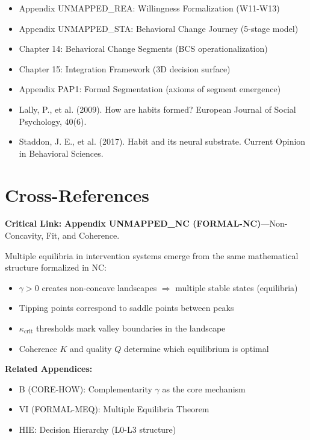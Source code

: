 \documentclass[11pt, a4paper]{article}
\begin{document}
\begin{itemize}
    \item Appendix UNMAPPED_REA: Willingness Formalization (W11-W13)
    \item Appendix UNMAPPED_STA: Behavioral Change Journey (5-stage model)
    \item Chapter 14: Behavioral Change Segments (BCS operationalization)
    \item Chapter 15: Integration Framework (3D decision surface)
    \item Appendix PAP1: Formal Segmentation (axioms of segment emergence)
    \item Lally, P., et al. (2009). How are habits formed? European Journal of Social Psychology, 40(6).
    \item Staddon, J. E., et al. (2017). Habit and its neural substrate. Current Opinion in Behavioral Sciences.
\end{itemize}


\section{Cross-References}
\label{sec:equ-crossref}

\begin{tcolorbox}[colback=gray!5!white, colframe=gray!50!black]
\textbf{Critical Link:} \textbf{Appendix UNMAPPED_NC (FORMAL-NC)}---Non-Concavity, Fit, and Coherence.

Multiple equilibria in intervention systems emerge from the same mathematical structure formalized in NC:
\begin{itemize}[nosep]
\item $\gamma > 0$ creates non-concave landscapes $\Rightarrow$ multiple stable states (equilibria)
\item Tipping points correspond to saddle points between peaks
\item $\kappa_{\text{crit}}$ thresholds mark valley boundaries in the landscape
\item Coherence $K$ and quality $Q$ determine which equilibrium is optimal
\end{itemize}

\textbf{Related Appendices:}
\begin{itemize}[nosep]
\item B (CORE-HOW): Complementarity $\gamma$ as the core mechanism
\item VI (FORMAL-MEQ): Multiple Equilibria Theorem
\item HIE: Decision Hierarchy (L0-L3 structure)
\end{itemize}
\end{tcolorbox}
\end{document}
